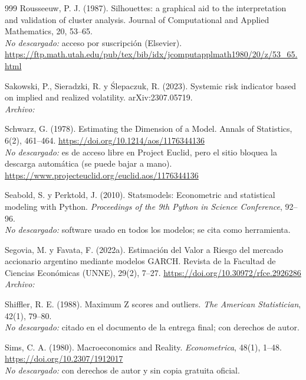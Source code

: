 \begin{thebibliography}{999}
Rousseeuw, P. J. (1987). Silhouettes: a graphical aid to the interpretation and validation of cluster analysis. Journal of Computational and Applied Mathematics, 20, 53–65.
\\\textit{No descargado:} acceso por suscripción (Elsevier). \url{https://ftp.math.utah.edu/pub/tex/bib/idx/jcomputapplmath1980/20/z/53_65.html}

Sakowski, P., Sieradzki, R. y Ślepaczuk, R. (2023). Systemic risk indicator based on implied and realized volatility. arXiv:2307.05719.
\\\textit{Archivo:} 

Schwarz, G. (1978). Estimating the Dimension of a Model. Annals of Statistics, 6(2), 461–464. \url{https://doi.org/10.1214/aos/1176344136}
\\\textit{No descargado:} es de acceso libre en Project Euclid, pero el sitio bloquea la descarga automática (se puede bajar a mano). \url{https://www.projecteuclid.org/euclid.aos/1176344136}

Seabold, S. y Perktold, J. (2010). Statsmodels: Econometric and statistical modeling with Python. \emph{Proceedings of the 9th Python in Science Conference}, 92--96.
\\\textit{No descargado:} software usado en todos los modelos; se cita como herramienta.

Segovia, M. y Favata, F. (2022a). Estimación del Valor a Riesgo del mercado accionario argentino mediante modelos GARCH. Revista de la Facultad de Ciencias Económicas (UNNE), 29(2), 7–27. \url{https://doi.org/10.30972/rfce.2926286}
\\\textit{Archivo:} 

Shiffler, R. E. (1988). Maximum Z scores and outliers. \emph{The American Statistician}, 42(1), 79--80.
\\\textit{No descargado:} citado en el documento de la entrega final; con derechos de autor.

Sims, C. A. (1980). Macroeconomics and Reality. \emph{Econometrica}, 48(1), 1--48. \url{https://doi.org/10.2307/1912017}
\\\textit{No descargado:} con derechos de autor y sin copia gratuita oficial.


\end{thebibliography}

